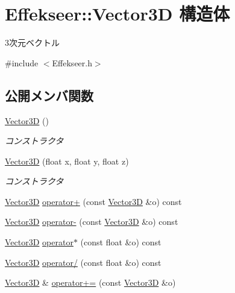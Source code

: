 \hypertarget{struct_effekseer_1_1_vector3_d}{}\section{Effekseer\+:\+:Vector3D 構造体}
\label{struct_effekseer_1_1_vector3_d}


3次元ベクトル  




{\ttfamily \#include $<$Effekseer.\+h$>$}

\subsection*{公開メンバ関数}
\begin{DoxyCompactItemize}
\item 
\mbox{\hyperlink{struct_effekseer_1_1_vector3_d_abf224ea54e943e49876d5d5843693661}{Vector3D}} ()
\begin{DoxyCompactList}\small\item\em コンストラクタ \end{DoxyCompactList}\item 
\mbox{\hyperlink{struct_effekseer_1_1_vector3_d_a304fedc7d4d4140d9e0930f1e9785393}{Vector3D}} (float x, float y, float z)
\begin{DoxyCompactList}\small\item\em コンストラクタ \end{DoxyCompactList}\item 
\mbox{\hyperlink{struct_effekseer_1_1_vector3_d}{Vector3D}} \mbox{\hyperlink{struct_effekseer_1_1_vector3_d_ad5b284129380bacd6229d796df3adecb}{operator+}} (const \mbox{\hyperlink{struct_effekseer_1_1_vector3_d}{Vector3D}} \&o) const
\item 
\mbox{\hyperlink{struct_effekseer_1_1_vector3_d}{Vector3D}} \mbox{\hyperlink{struct_effekseer_1_1_vector3_d_ae1da3b63871409cb8bb3e23b4305506d}{operator-\/}} (const \mbox{\hyperlink{struct_effekseer_1_1_vector3_d}{Vector3D}} \&o) const
\item 
\mbox{\hyperlink{struct_effekseer_1_1_vector3_d}{Vector3D}} \mbox{\hyperlink{struct_effekseer_1_1_vector3_d_a95d40548c0aeb66d531d8f0d1e781c5d}{operator$\ast$}} (const float \&o) const
\item 
\mbox{\hyperlink{struct_effekseer_1_1_vector3_d}{Vector3D}} \mbox{\hyperlink{struct_effekseer_1_1_vector3_d_ad6ee55218a4aa3836fa9c937eb976131}{operator/}} (const float \&o) const
\item 
\mbox{\hyperlink{struct_effekseer_1_1_vector3_d}{Vector3D}} \& \mbox{\hyperlink{struct_effekseer_1_1_vector3_d_ac0e5693b9a451103a3546b249b2d7547}{operator+=}} (const \mbox{\hyperlink{struct_effekseer_1_1_vector3_d}{Vector3D}} \&o)

\end{DoxyCompactItemize}
